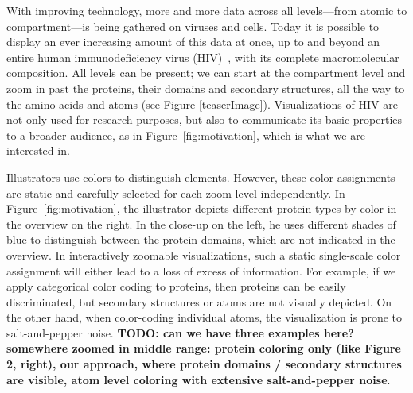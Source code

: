 \documentclass{egpubl}
\begin{document}
	With improving technology, more and more data across all levels---from atomic to compartment---is being gathered on viruses and cells. 
	Today it is possible to display an ever increasing amount of this data at once, up to and beyond an entire human immunodeficiency virus (HIV)~\cite{muzic2015cellview}, with its complete macromolecular composition.
	All levels can be present; we can start at the compartment level and zoom in past the proteins, their domains and secondary structures, all the way to the amino acids and atoms (see Figure \ref{teaserImage}). Visualizations of HIV are not only used for research purposes, but also to communicate its basic properties to a broader audience, as in Figure~\ref{fig:motivation}, which is what we are interested in.
	
	Illustrators use colors to distinguish elements. 
	However, these color assignments are static and carefully selected for each zoom level independently. 
	In Figure~\ref{fig:motivation}, the illustrator depicts different protein types by color in the overview on the right. 
	In the close-up on the left, he uses different shades of blue to distinguish between the protein domains, which are not indicated in the overview. 
	In interactively zoomable visualizations, such a static single-scale color assignment will either lead to a loss of excess of information. 
	For example, if we apply categorical color coding to proteins, then proteins can be easily discriminated, but secondary structures or atoms are not visually depicted.
	On the other hand, when color-coding individual atoms, the visualization is prone to salt-and-pepper noise. 
	\textbf{TODO: can we have three examples here? somewhere zoomed in middle range: protein coloring only (like Figure 2, right), our approach, where protein domains / secondary structures are visible, atom level coloring with extensive salt-and-pepper noise}. 
		
\end{document}
